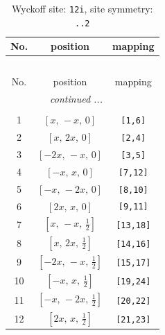 \documentclass[fleqn,8pt]{jsarticle}
\begin{document}
\begin{longtable}{ccc}
\caption{Wyckoff site: {\tt 12i}, site symmetry: {\tt ..2}}
 \\
 \hline \hline
No. & position & mapping \\ \hline \endfirsthead

\multicolumn{2}{l}{\tablename\ \thetable{}} \\
 \hline \hline
No. & position & mapping \\ \hline \endhead

 \hline \hline
\multicolumn{2}{r}{\footnotesize\it continued ...} \\ \endfoot

 \hline \hline
\multicolumn{2}{r}{} \\ \endlastfoot

1 & $\left[ x,\, - x,\, 0 \right]$ & {\tt [1,6]} \\ \hline
2 & $\left[ x,\, 2 x,\, 0 \right]$ & {\tt [2,4]} \\ \hline
3 & $\left[ - 2 x,\, - x,\, 0 \right]$ & {\tt [3,5]} \\ \hline
4 & $\left[ - x,\, x,\, 0 \right]$ & {\tt [7,12]} \\ \hline
5 & $\left[ - x,\, - 2 x,\, 0 \right]$ & {\tt [8,10]} \\ \hline
6 & $\left[ 2 x,\, x,\, 0 \right]$ & {\tt [9,11]} \\ \hline
7 & $\left[ x,\, - x,\, \frac{1}{2} \right]$ & {\tt [13,18]} \\ \hline
8 & $\left[ x,\, 2 x,\, \frac{1}{2} \right]$ & {\tt [14,16]} \\ \hline
9 & $\left[ - 2 x,\, - x,\, \frac{1}{2} \right]$ & {\tt [15,17]} \\ \hline
10 & $\left[ - x,\, x,\, \frac{1}{2} \right]$ & {\tt [19,24]} \\ \hline
11 & $\left[ - x,\, - 2 x,\, \frac{1}{2} \right]$ & {\tt [20,22]} \\ \hline
12 & $\left[ 2 x,\, x,\, \frac{1}{2} \right]$ & {\tt [21,23]} \\
\end{longtable}
\renewcommand{\arraystretch}{1.2}
\end{document}
